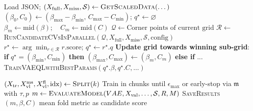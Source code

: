 \begin{algorithm}[ht]
\footnotesize %
\label{algo:betaC_corner_halving}
\begin{algorithmic}[1] %

  \Statex

    \State Load JSON; $(X_{\mathrm{full}}, X_{\mathrm{miss}}, \mathcal{S}) \gets \textsc{GetScaledData}(\dots)$
    \State $(\beta_0, C_0) \gets (\beta_{\max}-\beta_{\min},\, C_{\max}-C_{\min})$; \quad $q^\star \gets \varnothing$
      \State $\beta_m \gets \text{mid}(\beta); \quad C_m \gets \text{mid}(C)$
      \State $\mathcal{Q} \gets \text{Corner points of current grid}$ 
      \State $\mathcal{R} \gets$ \textsc{RunCandidateCVsInParallel}$(\mathcal{Q}, X_{\mathrm{full}}, X_{\mathrm{miss}}, \mathcal{S}, \text{config})$
      \State $r^\star \gets \arg\min_{r \in \mathcal{R}} r.\text{score}$; \quad $q^\star \gets r^\star.q$
      \State \textbf{Update grid towards winning sub-grid}:
      \State \textbf{if} $q^\star=(\beta_{\min},C_{\min})$ \textbf{then} $(\beta_{\max},C_{\max}) \gets (\beta_m,C_m)$
      \State \textbf{else if} ... 
    \EndWhile
    \State \textsc{TrainVAEQLwithBestParams}$(q^\star.\beta, q^\star.C, \dots)$
  \EndProcedure

  \Statex
      \State $(X_{\text{tr}}, X_{\text{vl}}^{\text{ms}}, X_{\text{vl}}^{\text{fl}}, \text{idx}) \gets \textsc{Split}(k)$ 
      \State Train in chunks until $\epsilon_{\max}$ or early-stop via $\mathfrak{m}$ with $\tau, p$
      \State $m \gets \textsc{EvaluateModel}(VAE, X_{\text{val}}, \dots, \mathcal{S}, R, M)$
      \State \textsc{SaveResults}$(m, \beta, C)$
    \EndFor
    \State \Return mean fold metric as candidate score
  \EndProcedure
\end{algorithmic}
\end{algorithm}